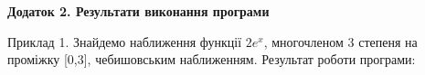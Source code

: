 \documentclass[ukrainian,14pt]{extarticle}
\begin{document}
\textbf{Додаток 2. Результати виконання програми}
\vspace{1cm}

Приклад 1. Знайдемо наближення функції $2 e^x$, многочленом 3 степеня на проміжку [0,3], чебишовським наближенням.
Результат роботи програми:
\end{document}
